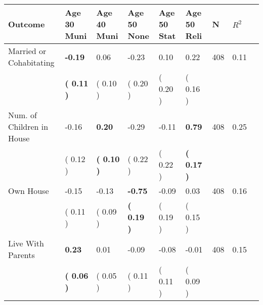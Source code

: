\begin{tabular}{L{6.2cm} C{1.8cm} C{1.8cm} C{1.8cm} C{1.8cm} C{1.8cm} C{1.8cm} C{0.3cm} C{0.3cm}}
\toprule
 \textbf{Outcome} & \textbf{Age 30 Muni} & \textbf{Age 40 Muni} & \textbf{Age 50 None} & \textbf{Age 50 Stat} & \textbf{Age 50 Reli} & \textbf{N} & \textbf{$ R^2$} \\
\midrule
Married or Cohabitating & \textbf{    -0.19} &      0.06 &     -0.23 &      0.10 &      0.22  & 408 &       0.11 \\ 
 & \textbf{(     0.11 )} & (     0.10 ) & (     0.20 ) & (     0.20 ) & (     0.16 )  & \\
Num. of Children in House &     -0.16 & \textbf{     0.20} &     -0.29 &     -0.11 & \textbf{     0.79}  & 408 &       0.25 \\ 
 & (     0.12 ) & \textbf{(     0.10 )} & (     0.22 ) & (     0.22 ) & \textbf{(     0.17 )}  & \\
Own House &     -0.15 &     -0.13 & \textbf{    -0.75} &     -0.09 &      0.03  & 408 &       0.16 \\ 
 & (     0.11 ) & (     0.09 ) & \textbf{(     0.19 )} & (     0.19 ) & (     0.15 )  & \\
Live With Parents & \textbf{     0.23} &      0.01 &     -0.09 &     -0.08 &     -0.01  & 408 &       0.15 \\ 
 & \textbf{(     0.06 )} & (     0.05 ) & (     0.11 ) & (     0.11 ) & (     0.09 )  & \\
\bottomrule
\end{tabular}
